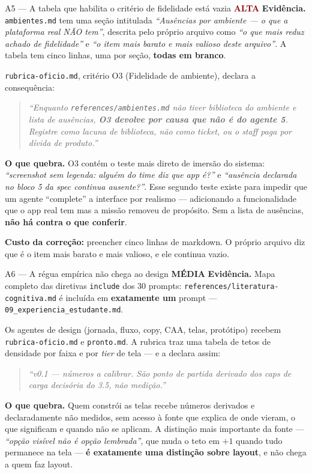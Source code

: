 \documentclass[11pt,a4paper]{article}
\newcommand{\sevalta}{\textcolor{DarkRed}{\textbf{ALTA}}}
\newcommand{\sevmedia}{\textcolor{DarkYellow}{\textbf{M\'EDIA}}}
\begin{document}
\begin{achadobox}{A5 --- A tabela que habilita o crit\'erio de fidelidade est\'a vazia \hfill \sevalta}
\textbf{Evid\^encia.} \texttt{ambientes.md} tem uma se\c{c}\~ao intitulada \emph{``Aus\^encias por
ambiente --- o que a plataforma real N\~AO tem''}, descrita pelo pr\'oprio arquivo como \emph{``o
que mais reduz achado de fidelidade''} e \emph{``o item mais barato e mais valioso deste
arquivo''}. A tabela tem cinco linhas, uma por se\c{c}\~ao, \textbf{todas em branco}.

\texttt{rubrica-oficio.md}, crit\'erio O3 (Fidelidade de ambiente), declara a consequ\^encia:
\begin{quote}\small
\emph{``Enquanto \texttt{references/ambientes.md} n\~ao tiver biblioteca do ambiente e lista de
aus\^encias, \textbf{O3 devolve por causa que n\~ao \'e do agente 5}. Registre como lacuna de
biblioteca, n\~ao como ticket, ou o staff paga por d\'ivida de produto.''}
\end{quote}

\textbf{O que quebra.} O3 cont\'em o teste mais direto de imers\~ao do sistema: \emph{``screenshot
sem legenda: algu\'em do time diz que app \'e?''} e \emph{``aus\^encia declarada no bloco 5 da spec
continua ausente?''}. Esse segundo teste existe para impedir que um agente ``complete'' a interface
por realismo --- adicionando a funcionalidade que o app real tem mas a miss\~ao removeu de
prop\'osito. Sem a lista de aus\^encias, \textbf{n\~ao h\'a contra o que conferir}.

\textbf{Custo da corre\c{c}\~ao:} preencher cinco linhas de markdown. O pr\'oprio arquivo diz que
\'e o item mais barato e mais valioso, e ele continua vazio.
\end{achadobox}

\begin{achadobox}{A6 --- A r\'egua emp\'irica n\~ao chega ao design \hfill \sevmedia}
\textbf{Evid\^encia.} Mapa completo das diretivas \texttt{include} dos 30 prompts:
\texttt{references/literatura-cognitiva.md} \'e inclu\'ida em \textbf{exatamente um} prompt ---
\texttt{09\_experiencia\_estudante.md}.

Os agentes de design (jornada, fluxo, copy, CAA, telas, prot\'otipo) recebem
\texttt{rubrica-oficio.md} e \texttt{pronto.md}. A rubrica traz uma tabela de tetos de densidade
por faixa e por \emph{tier} de tela --- e a declara assim:
\begin{quote}\small
\emph{``v0.1 --- n\'umeros a calibrar. S\~ao ponto de partida derivado dos caps de carga
decis\'oria do 3.5, n\~ao medi\c{c}\~ao.''}
\end{quote}

\textbf{O que quebra.} Quem constr\'oi as telas recebe n\'umeros derivados e declaradamente n\~ao
medidos, sem acesso \`a fonte que explica de onde vieram, o que significam e quando n\~ao se
aplicam. A distin\c{c}\~ao mais importante da fonte --- \emph{``op\c{c}\~ao vis\'ivel n\~ao \'e
op\c{c}\~ao lembrada''}, que muda o teto em $+1$ quando tudo permanece na tela ---
\textbf{\'e exatamente uma distin\c{c}\~ao sobre layout}, e n\~ao chega a quem faz layout.
\end{achadobox}
\end{document}
